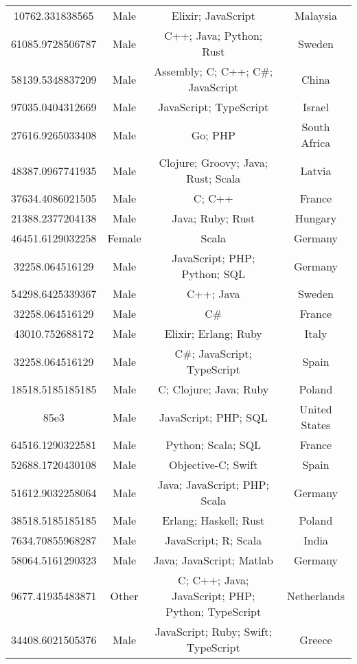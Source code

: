 \begin{center}
\begin{tabular}{ |c|c|c|c| }
10762.331838565  &  Male  &  Elixir; JavaScript  &  Malaysia  \\ 
61085.9728506787  &  Male  &  C++; Java; Python; Rust  &  Sweden  \\ 
58139.5348837209  &  Male  &  Assembly; C; C++; C\#; JavaScript  &  China  \\ 
97035.0404312669  &  Male  &  JavaScript; TypeScript  &  Israel  \\ 
27616.9265033408  &  Male  &  Go; PHP  &  South Africa  \\ 
48387.0967741935  &  Male  &  Clojure; Groovy; Java; Rust; Scala  &  Latvia  \\ 
37634.4086021505  &  Male  &  C; C++  &  France  \\ 
21388.2377204138  &  Male  &  Java; Ruby; Rust  &  Hungary  \\ 
46451.6129032258  &  Female  &  Scala  &  Germany  \\ 
32258.064516129  &  Male  &  JavaScript; PHP; Python; SQL  &  Germany  \\ 
54298.6425339367  &  Male  &  C++; Java  &  Sweden  \\ 
32258.064516129  &  Male  &  C\#  &  France  \\ 
43010.752688172  &  Male  &  Elixir; Erlang; Ruby  &  Italy  \\ 
32258.064516129  &  Male  &  C\#; JavaScript; TypeScript  &  Spain  \\ 
18518.5185185185  &  Male  &  C; Clojure; Java; Ruby  &  Poland  \\ 
85e3  &  Male  &  JavaScript; PHP; SQL  &  United States  \\ 
64516.1290322581  &  Male  &  Python; Scala; SQL  &  France  \\ 
52688.1720430108  &  Male  &  Objective-C; Swift  &  Spain  \\ 
51612.9032258064  &  Male  &  Java; JavaScript; PHP; Scala  &  Germany  \\ 
38518.5185185185  &  Male  &  Erlang; Haskell; Rust  &  Poland  \\ 
7634.70855968287  &  Male  &  JavaScript; R; Scala  &  India  \\ 
58064.5161290323  &  Male  &  Java; JavaScript; Matlab  &  Germany  \\ 
9677.41935483871  &  Other  &  C; C++; Java; JavaScript; PHP; Python; TypeScript  &  Netherlands  \\ 
34408.6021505376  &  Male  &  JavaScript; Ruby; Swift; TypeScript  &  Greece  \\ 

\end{tabular}
\end{center}
